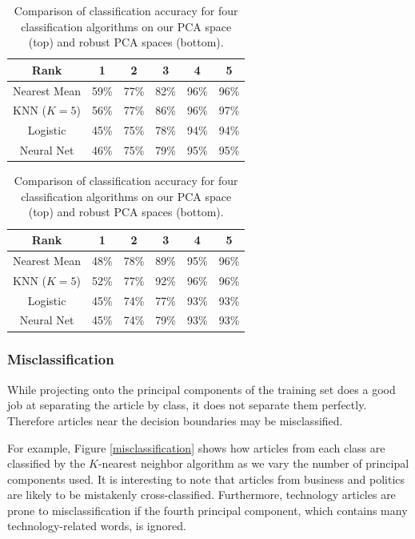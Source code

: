 \documentclass[12pt]{article}
\begin{document}
\begin{table}[H]
\begin{center}
\begin{tabular}{c | c | c | c | c | c}
 {\bf Rank } & {\bf 1 } & {\bf 2} & {\bf 3} & {\bf 4} & {\bf 5 } \\ \hline
Nearest Mean & 59\% & 77\% & 82\% & 96\%  & 96\% \\
KNN ($K = 5$) & 56\% & 77\% & 86\% & 96\%  & 97\% \\
Logistic & 45\% & 75\% & 78\% & 94\%  & 94\% \\
Neural Net & 46\% & 75\% & 79\% & 95\%  & 95\%
\end{tabular}
\end{center} 

\begin{center}
\begin{tabular}{c | c | c | c | c | c}
 {\bf Rank } & {\bf 1 } & {\bf 2} & {\bf 3} & {\bf 4} & {\bf 5 } \\ \hline
Nearest Mean & 48\% & 78\% & 89\% & 95\%  & 96\% \\
KNN ($K = 5$) & 52\% & 77\% & 92\% & 96\%  & 96\% \\
Logistic & 45\% & 74\% & 77\% & 93\%  & 93\% \\
Neural Net & 45\% & 74\% & 79\% & 93\%  & 93\%
\end{tabular}
\end{center}
\caption{Comparison of classification accuracy for four classification algorithms on our PCA space (top) and robust PCA spaces (bottom).}
\end{table}

\subsubsection{Misclassification}
While projecting onto the principal components of the training set does a good job at separating the article by class, it does
not separate them perfectly. Therefore articles near the decision boundaries may be misclassified.

For example, Figure \ref{misclassification} shows how articles from each class are classified by the $K$-nearest neighbor algorithm as we vary the number of principal components used. It is interesting to note that articles from business and politics are likely to be mistakenly cross-classified. Furthermore, technology articles are prone to misclassification if the fourth principal component, which contains many technology-related words, is ignored.
\end{document}
